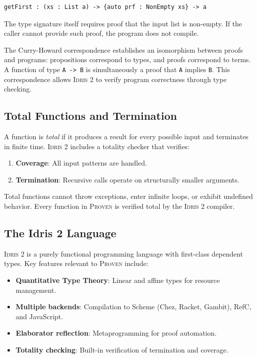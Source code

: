 \documentclass[11pt,a4paper]{article}
\newcommand{\proven}{\textsc{Proven}}
\newcommand{\idris}{\textsc{Idris 2}}
\begin{document}
\begin{lstlisting}
getFirst : (xs : List a) -> {auto prf : NonEmpty xs} -> a
\end{lstlisting}

The type signature itself requires proof that the input list is non-empty. If the caller cannot provide such proof, the program does not compile.

The Curry-Howard correspondence establishes an isomorphism between proofs and programs: propositions correspond to types, and proofs correspond to terms. A function of type \texttt{A -> B} is simultaneously a proof that \texttt{A} implies \texttt{B}. This correspondence allows \idris{} to verify program correctness through type checking.

\subsection{Total Functions and Termination}

A function is \emph{total} if it produces a result for every possible input and terminates in finite time. \idris{} includes a totality checker that verifies:

\begin{enumerate}
    \item \textbf{Coverage}: All input patterns are handled.
    \item \textbf{Termination}: Recursive calls operate on structurally smaller arguments.
\end{enumerate}

Total functions cannot throw exceptions, enter infinite loops, or exhibit undefined behavior. Every function in \proven{} is verified total by the \idris{} compiler.

\subsection{The Idris 2 Language}

\idris{} \cite{brady2021idris2} is a purely functional programming language with first-class dependent types. Key features relevant to \proven{} include:

\begin{itemize}
    \item \textbf{Quantitative Type Theory}: Linear and affine types for resource management.
    \item \textbf{Multiple backends}: Compilation to Scheme (Chez, Racket, Gambit), RefC, and JavaScript.
    \item \textbf{Elaborator reflection}: Metaprogramming for proof automation.
    \item \textbf{Totality checking}: Built-in verification of termination and coverage.
\end{itemize}
\end{document}
